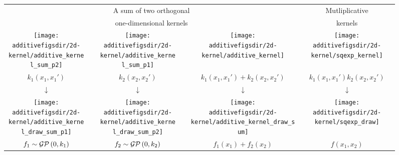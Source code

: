 \begin{figure}[ht!]
\centering
\begin{tabular}{ccccc|c}
\multicolumn{5}{c|}{A sum of two orthogonal} & \multicolumn{1}{c}{Mutliplicative} \\
\multicolumn{5}{c|}{ one-dimensional kernels} & \multicolumn{1}{c}{kernels} \\
\hspace{-0.2cm}\texttt{[image: \\additivefigsdir/2d-kernel/additive\_kernel\_sum\_p2]} 
& \hspace{-0.4cm} \raisebox{1cm}{+} \hspace{-0.4cm} & 
\texttt{[image: \\additivefigsdir/2d-kernel/additive\_kernel\_sum\_p1]} 
& \hspace{-0.4cm} \raisebox{1cm}{=} \hspace{-0.4cm} & 
\texttt{[image: \\additivefigsdir/2d-kernel/additive\_kernel]} &
\texttt{[image: \\additivefigsdir/2d-kernel/sqexp\_kernel]} \\
$k_1(x_1, x_1')$ & & $k_2(x_2, x_2')$ & & $k_1(x_1,x_1') + k_2(x_2,x_2')$ &$k_1(x_1,x_1')k_2(x_2,x_2')$ \\[1em]
\large $\downarrow$ & & \large $\downarrow$ & & \large $\downarrow$ & \large $\downarrow$  \\[-0.2em]
\hspace{-0.2cm}\texttt{[image: \\additivefigsdir/2d-kernel/additive\_kernel\_draw\_sum\_p1]}
& \hspace{-0.4cm} \raisebox{1cm}{+} \hspace{-0.4cm} & 
\texttt{[image: \\additivefigsdir/2d-kernel/additive\_kernel\_draw\_sum\_p2]}
& \hspace{-0.4cm} \raisebox{1cm}{=} \hspace{-0.4cm} &
\texttt{[image: \\additivefigsdir/2d-kernel/additive\_kernel\_draw\_sum]} &
\texttt{[image: \\additivefigsdir/2d-kernel/sqexp\_draw]} \\
$f_1 \sim \mathcal{GP}\left(0, k_1\right)$ & & $f_2 \sim \mathcal{GP}\left(0, k_2\right)$ & & $f_1(x_1) + f_2(x_2)$ & $f(x_1, x_2)$ \\

\end{tabular}
\end{figure}
